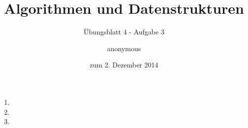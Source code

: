 \documentclass[a4paper]{scrartcl}
\title{Algorithmen und Datenstrukturen}
\subtitle{Übungsblatt 4 - Aufgabe 3}
\author{
    anonymous
}
\date{zum 2. Dezember 2014}
\begin{document}
\maketitle

\begin{enumerate}
    \item

    \item

    \item

\end{enumerate}
\end{document}
